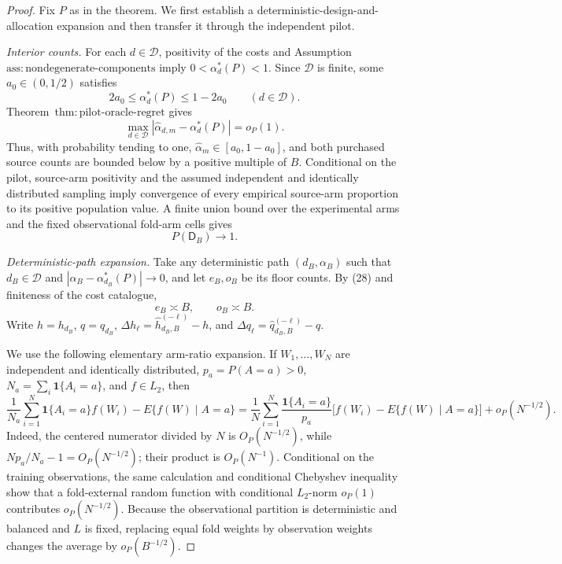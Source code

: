 \documentclass{article}
\begin{document}
\begin{proof}
Fix \(P\) as in the theorem.  We first establish a deterministic-design-and-allocation expansion and then transfer it through the independent pilot.

\emph{Interior counts.}  For each \(d\in\mathcal D\), positivity of the costs and Assumption~\(\mathrm{ass{:}nondegenerate\text{-}components}\) imply \(0<\alpha_d^*(P)<1\).  Since \(\mathcal D\) is finite, some \(a_0\in(0,1/2)\) satisfies
\[
 2a_0\le \alpha_d^*(P)\le1-2a_0
 \qquad(d\in\mathcal D).                                    \tag{28}
\]
Theorem~\(\mathrm{thm{:}pilot\text{-}oracle\text{-}regret}\) gives
\[
 \max_{d\in\mathcal D}|\widehat\alpha_{d,m}-\alpha_d^*(P)|=o_P(1). \tag{29}
\]
Thus, with probability tending to one, \(\widehat\alpha_m\in[a_0,1-a_0]\), and both purchased source counts are bounded below by a positive multiple of \(B\).  Conditional on the pilot, source-arm positivity and the assumed independent and identically distributed sampling imply convergence of every empirical source-arm proportion to its positive population value.  A finite union bound over the experimental arms and the fixed observational fold-arm cells gives
\[
 P(\mathsf D_B)\longrightarrow1.                              \tag{30}
\]

\emph{Deterministic-path expansion.}  Take any deterministic path \((d_B,\alpha_B)\) such that \(d_B\in\mathcal D\) and \(|\alpha_B-\alpha_{d_B}^*(P)|\to0\), and let \(e_B,o_B\) be its floor counts.  By (28) and finiteness of the cost catalogue,
\[
 e_B\asymp B,\qquad o_B\asymp B.                             \tag{31}
\]
Write \(h=h_{d_B}\), \(q=q_{d_B}\), \(\Delta h_\ell=\widehat h_{d_B,B}^{(-\ell)}-h\), and \(\Delta q_\ell=\widehat q_{d_B,B}^{(-\ell)}-q\).

We use the following elementary arm-ratio expansion.  If \(W_1,\ldots,W_N\) are independent and identically distributed, \(p_a=P(A=a)>0\), \(N_a=\sum_i\mathbf1\{A_i=a\}\), and \(f\in L_2\), then
\[
 \frac1{N_a}\sum_{i=1}^N\mathbf1\{A_i=a\}f(W_i)
 -E\{f(W)\mid A=a\}
 =\frac1N\sum_{i=1}^N\frac{\mathbf1\{A_i=a\}}{p_a}
 \bigl[f(W_i)-E\{f(W)\mid A=a\}\bigr]+o_P(N^{-1/2}).       \tag{32}
\]
Indeed, the centered numerator divided by \(N\) is \(O_P(N^{-1/2})\), while \(Np_a/N_a-1=O_P(N^{-1/2})\); their product is \(O_P(N^{-1})\).  Conditional on the training observations, the same calculation and conditional Chebyshev inequality show that a fold-external random function with conditional \(L_2\)-norm \(o_P(1)\) contributes \(o_P(N^{-1/2})\).  Because the observational partition is deterministic and balanced and \(L\) is fixed, replacing equal fold weights by observation weights changes the average by \(o_P(B^{-1/2})\).


\end{proof}
\end{document}
